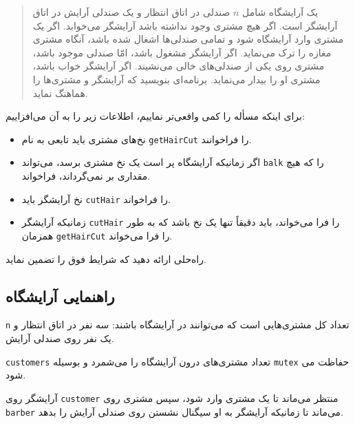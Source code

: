 \documentclass{book}
\newcommand{\clearemptydoublepage}{\newpage\cleardoublepage}
\begin{document}
\begin {quotation}
    یک آرایشگاه شامل $n$ صندلی در اتاق انتظار و یک صندلی آرایش در اتاق آرایشگر است. 
    اگر هیچ مشتری وجود نداشته باشد آرایشگر می‌خوابد. 
    اگر یک مشتری وارد آرایشگاه شود و تمامی صندلی‌ها اشغال شده باشد، آنگاه مشتری مغازه را ترک می‌نماید. 
    اگر آرایشگر مشغول باشد، امّا صندلی موجود باشد، مشتری روی یکی از صندلی‌های خالی می‌نشیند. 
    اگر آرایشگر خواب باشد، مشتری او را بیدار می‌نماید. 
    برنامه‌ای بنویسید که آرایشگر و مشتری‌ها را هماهنگ نماید. 
\end{quotation}

    برای اینکه مسأله را کمی واقعی‌تر نماییم، اطلاعات زیر را به آن می‌افزاییم: 

\begin{itemize}

\item
    نخ‌های مشتری باید تابعی به نام {\tt getHairCut} را فراخوانند. 

\item 
    اگر زمانیکه آرایشگاه پر است یک نخ مشتری برسد، می‌تواند {\tt balk} را که هیچ مقداری بر نمی‌گرداند،  فراخواند. 

\item 
    نخ آرایشگر باید {\tt cutHair} را فراخواند. 

\item 
    زمانیکه آرایشگر {\tt cutHair} را فرا می‌خواند،‌ 
    باید دقیقاً تنها یک نخ باشد که به طور همزمان  {\tt getHairCut} را فرا می‌خواند. 

\end{itemize}

    راه‌حلی ارائه دهید  که شرایط فوق را تضمین نماید. 


\clearemptydoublepage
\subsection{راهنمایی آرایشگاه}

\begin{latin}

\end{latin}

    {\tt n}    تعداد کل مشتری‌هایی است که می‌توانند در آرایشگاه باشند: سه نفر در اتاق انتظار و یک نفر روی صندلی آرایش. 

    {\tt customers}        تعداد مشتری‌های درون آرایشگاه را می‌شمرد و بوسیله  {\tt mutex} حفاظت می‌ شود. 
    

    آرایشگر روی {\tt customer} منتظر می‌ماند تا یک مشتری وارد شود، 
    سپس مشتری روی  {\tt barber} می‌ماند تا زمانیکه آرایشگر به او سیگنال نشستن روی صندلی آرایش را بدهد. 
\end{document}
